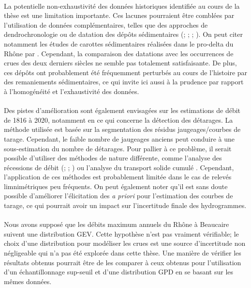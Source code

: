 	\paragraph{} La potentielle non-exhaustivité des données historiques identifiée au cours de la thèse est une limitation importante. Ces lacunes pourraient être comblées par l'utilisation de données complémentaires, telles que des approches de dendrochronologie \citep{ballesteros-canovas_review_2015} ou de datation des dépôts sédimentaires (\cite{dezileau_multidating_2014}; \cite{engeland_new_2020}; \cite{corella_1400-years_2021}; \cite{wilhelm_reconstructing_2022}). On peut citer notamment les études de carottes sédimentaires réalisées dans le pro-delta du Rhône par \citet{fanget_historical_2013}. Cependant, la comparaison des datations avec les occurrences de crues des deux derniers siècles ne semble pas totalement satisfaisante. De plus, ces dépôts ont probablement été fréquemment perturbés au cours de l'histoire par des remaniements sédimentaires, ce qui invite ici aussi à la prudence par rapport à l'homogénéité et l'exhaustivité des données. 
	
	\paragraph{} Des pistes d'amélioration sont également envisagées sur les estimations de débit de 1816 à 2020, notamment en ce qui concerne la détection des détarages. La méthode utilisée est basée sur la segmentation des résidus jaugeages/courbes de tarage. Cependant, le faible nombre de jaugeages anciens peut conduire à une sous-estimation du nombre de détarages. Pour pallier à ce problème, il serait possible d'utiliser des méthodes de nature différente, comme l'analyse des récessions de débit (\cite{vogel_estimation_1996}; \cite{chapman_comparison_1999}; \cite{darienzo_detection_2021-1}) ou l'analyse du transport solide cumulé \citep{darienzo_detection_2021-1}. Cependant, l'application de ces méthodes est probablement limitée dans le cas de relevés limnimétriques peu fréquents. On peut également noter qu'il est sans doute possible d'améliorer l'élicitation des \textit{a priori} pour l'estimation des courbes de tarage, ce qui pourrait avoir un impact sur l'incertitude finale des hydrogrammes.	
		
		\paragraph{} Nous avons supposé que les débits maximum annuels du Rhône à Beaucaire suivent une distribution GEV. Cette hypothèse n'est pas vraiment vérifiable; le choix d'une distribution pour modéliser les crues est une source d'incertitude non négligeable qui n'a pas été explorée dans cette thèse. Une manière de vérifier les résultats obtenus pourrait être de les comparer à ceux obtenus pour l'utilisation d'un échantillonnage sup-seuil et d'une distribution GPD en se basant sur les mêmes données. 		
		
